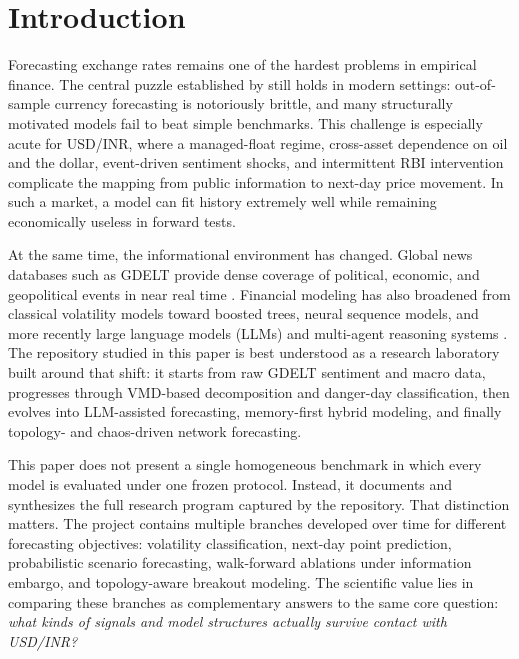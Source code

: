 \documentclass[11pt,a4paper]{article}
\begin{document}
\section{Introduction}

Forecasting exchange rates remains one of the hardest problems in empirical finance. The central puzzle established by \citet{meese1983} still holds in modern settings: out-of-sample currency forecasting is notoriously brittle, and many structurally motivated models fail to beat simple benchmarks. This challenge is especially acute for USD/INR, where a managed-float regime, cross-asset dependence on oil and the dollar, event-driven sentiment shocks, and intermittent RBI intervention complicate the mapping from public information to next-day price movement. In such a market, a model can fit history extremely well while remaining economically useless in forward tests.

At the same time, the informational environment has changed. Global news databases such as GDELT provide dense coverage of political, economic, and geopolitical events in near real time \citep{leetaru2013}. Financial modeling has also broadened from classical volatility models \citep{bollerslev1986, nelson1991} toward boosted trees, neural sequence models, and more recently large language models (LLMs) and multi-agent reasoning systems \citep{chen2016xgboost, sezer2020, lopez2023, xie2023, li2024llm}. The repository studied in this paper is best understood as a research laboratory built around that shift: it starts from raw GDELT sentiment and macro data, progresses through VMD-based decomposition and danger-day classification, then evolves into LLM-assisted forecasting, memory-first hybrid modeling, and finally topology- and chaos-driven network forecasting.

This paper does not present a single homogeneous benchmark in which every model is evaluated under one frozen protocol. Instead, it documents and synthesizes the full research program captured by the repository. That distinction matters. The project contains multiple branches developed over time for different forecasting objectives: volatility classification, next-day point prediction, probabilistic scenario forecasting, walk-forward ablations under information embargo, and topology-aware breakout modeling. The scientific value lies in comparing these branches as complementary answers to the same core question: \textit{what kinds of signals and model structures actually survive contact with USD/INR?}
\end{document}
